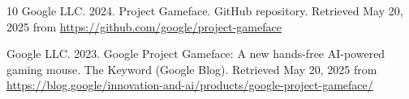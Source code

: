 \documentclass[manuscript,screen,review,anonymous]{acmart}
\begin{document}
\begin{thebibliography}{10}
Google LLC. 2024.
Project Gameface.
GitHub repository.
Retrieved May 20, 2025 from \url{https://github.com/google/project-gameface}

Google LLC. 2023.
Google Project Gameface: A new hands-free AI-powered gaming mouse.
The Keyword (Google Blog).
Retrieved May 20, 2025 from \url{https://blog.google/innovation-and-ai/products/google-project-gameface/}


\end{thebibliography}
\end{document}
